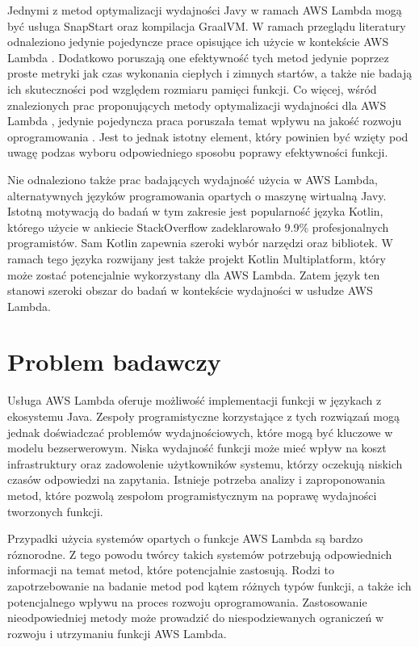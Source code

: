 Jednymi z metod optymalizacji wydajności Javy w ramach AWS Lambda mogą być usługa SnapStart oraz kompilacja GraalVM.
W ramach przeglądu literatury odnaleziono jedynie pojedyncze prace opisujące ich użycie w kontekście AWS Lambda \cite{menéndez2023performancebestpracticesusing}\cite{ritzal2020optimizing}.
Dodatkowo poruszają one efektywność tych metod jedynie poprzez proste metryki jak czas wykonania ciepłych i zimnych startów, a także nie badają ich skuteczności pod względem rozmiaru pamięci funkcji.
Co więcej, wśród znalezionych prac proponujących metody optymalizacji wydajności dla AWS Lambda \cite{8116416}\cite{10.1145/3377812.3382135}\cite{9860368}\cite{FerreiraDosSantos2023}\cite{10.1145/3458336.3465305}\cite{menéndez2023performancebestpracticesusing}\cite{ritzal2020optimizing},
jedynie pojedyncza praca poruszała temat wpływu na jakość rozwoju oprogramowania \cite{10.1145/3377812.3382135}.
Jest to jednak istotny element, który powinien być wzięty pod uwagę podzas wyboru odpowiedniego sposobu poprawy efektywności funkcji.

Nie odnaleziono także prac badających wydajność użycia w AWS Lambda, alternatywnych języków programowania opartych o maszynę wirtualną Javy.
Istotną motywacją do badań w tym zakresie jest popularność języka Kotlin, którego użycie w ankiecie StackOverflow \cite{stackoverflow_survey_2024} zadeklarowało 9.9\% profesjonalnych programistów.
Sam Kotlin zapewnia szeroki wybór narzędzi oraz bibliotek. W ramach tego języka rozwijany jest także projekt Kotlin Multiplatform, który może zostać potencjalnie wykorzystany dla AWS Lambda.
Zatem język ten stanowi szeroki obszar do badań w kontekście wydajności w usłudze AWS Lambda.

\section*{Problem badawczy}\label{chapter:problem_badawczy}

Usługa AWS Lambda oferuje możliwość implementacji funkcji w językach z ekosystemu Java.
Zespoły programistyczne korzystające z tych rozwiązań mogą jednak doświadczać problemów wydajnościowych, które mogą być kluczowe w modelu bezserwerowym.
Niska wydajność funkcji może mieć wpływ na koszt infrastruktury oraz zadowolenie użytkowników systemu, którzy oczekują niskich czasów odpowiedzi na zapytania.
Istnieje potrzeba analizy i zaproponowania metod, które pozwolą zespołom programistycznym na poprawę wydajności tworzonych funkcji.

Przypadki użycia systemów opartych o funkcje AWS Lambda są bardzo róznorodne.
Z tego powodu twórcy takich systemów potrzebują odpowiednich informacji na temat metod, które potencjalnie zastosują.
Rodzi to zapotrzebowanie na badanie metod pod kątem różnych typów funkcji, a także ich potencjalnego wpływu na proces rozwoju oprogramowania.
Zastosowanie nieodpowiedniej metody może prowadzić do niespodziewanych ograniczeń w rozwoju i utrzymaniu funkcji AWS Lambda.

